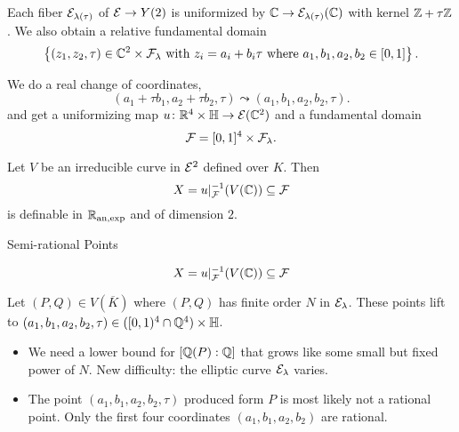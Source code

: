 \documentclass{beamer}
\begin{document}
\begin{frame}
  Each fiber ${\mathcal E}_{\lambda(\tau)}$ of ${\mathcal E}\rightarrow Y(2)$ is
  uniformized by ${\mathbb{C}}\rightarrow {\mathcal E}_{\lambda(\tau)}({\mathbb{C}})$ with kernel
  ${\mathbb{Z}}+\tau{\mathbb{Z}}$.
  We also obtain a relative fundamental domain
  \begin{equation*}
     \left\{(z_1,z_2,\tau) \in
    {\mathbb{C}}^2\times {\mathcal F}_{\lambda} \text{ with }z_i=a_i+b_i\tau\text{
      where }a_1,b_1,a_2,b_2\in [0,1]  \right\}. 
  \end{equation*}

  We do a real change of coordinates,
  $$ (a_1+\tau b_1,a_2 + \tau
  b_2,\tau)\leadsto (a_1,b_1,a_2,b_2,\tau).$$
  and get a uniformizing map $u\colon{\mathbb{R}}^4 \times {\mathbb{H}}\rightarrow{\mathcal E}({\mathbb{C}}^2)$
  and a fundamental domain
  \begin{equation*}
    {\mathcal F} = [0,1]^4\times {\mathcal F}_{\lambda}. 
  \end{equation*}

  Let $V$ be an irreducible curve in ${\mathcal E}^2$ defined over $K$. Then
  \begin{equation*}
    X = u|_{{\mathcal F}}^{-1}(V({\mathbb{C}})) \subseteq {\mathcal F}
  \end{equation*}
  is definable in ${{\mathbb{R}}_{\mathrm{an,exp}}}$ and of dimension $2$. 
\end{frame}


\begin{frame}{Semi-rational Points}
  
  \begin{equation*}
    X = u|_{{\mathcal F}}^{-1}(V({\mathbb{C}})) \subseteq {\mathcal F}
  \end{equation*}

  Let $(P,Q) \in V(\overline K)$ where $(P,Q)$ has finite order $N$
  in ${\mathcal E}_\lambda$. 
  These points lift to $(a_1,b_1,a_2,b_2,\tau)\in
  ([0,1)^4\cap{\mathbb{Q}}^4)\times{\mathbb{H}}$.

  
  \begin{itemize}
  \item  We need a lower bound for $[{\mathbb{Q}}(P):{\mathbb{Q}}]$ that grows like
    some small but fixed power of $N$. New difficulty: the
    elliptic curve ${\mathcal E}_{\lambda}$ \alert{varies}. 
    
  \item The point $(a_1,b_1,a_2,b_2,\tau)$ produced form $P$ is
    most likely
    \alert{not} a rational point. Only the first four
    coordinates $(a_1,b_1,a_2,b_2)$ are rational.
  \end{itemize}
\end{frame}
\end{document}
